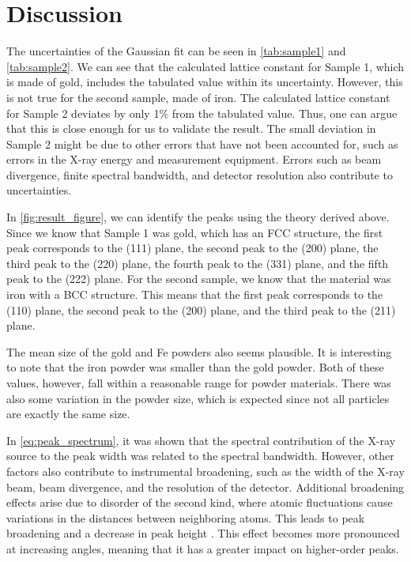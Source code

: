 \section{Discussion}
The uncertainties of the Gaussian fit can be seen in \autoref{tab:sample1} and \autoref{tab:sample2}. We can see that the calculated lattice constant for Sample 1, which is made of gold, includes the tabulated value within its uncertainty. However, this is not true for the second sample, made of iron. The calculated lattice constant for Sample 2 deviates by only 1\% from the tabulated value. Thus, one can argue that this is close enough for us to validate the result. The small deviation in Sample 2 might be due to other errors that have not been accounted for, such as errors in the X-ray energy and measurement equipment. Errors such as beam divergence, finite spectral bandwidth, and detector resolution also contribute to uncertainties.


In \autoref{fig:result_figure}, we can identify the peaks using the theory derived above. Since we know that Sample 1 was gold, which has an FCC structure, the first peak corresponds to the (111) plane, the second peak to the (200) plane, the third peak to the (220) plane, the fourth peak to the (331) plane, and the fifth peak to the (222) plane. For the second sample, we know that the material was iron with a BCC structure. This means that the first peak corresponds to the (110) plane, the second peak to the (200) plane, and the third peak to the (211) plane.

The mean size of the gold and Fe powders also seems plausible. It is interesting to note that the iron powder was smaller than the gold powder. Both of these values, however, fall within a reasonable range for powder materials. There was also some variation in the powder size, which is expected since not all particles are exactly the same size.

In \autoref{eq:peak_spectrum}, it was shown that the spectral contribution of the X-ray source to the peak width was related to the spectral bandwidth. However, other factors also contribute to instrumental broadening, such as the width of the X-ray beam, beam divergence, and the resolution of the detector. Additional broadening effects arise due to disorder of the second kind, where atomic fluctuations cause variations in the distances between neighboring atoms. This leads to peak broadening and a decrease in peak height \cite{guinier1963xray}. This effect becomes more pronounced at increasing angles, meaning that it has a greater impact on higher-order peaks.
